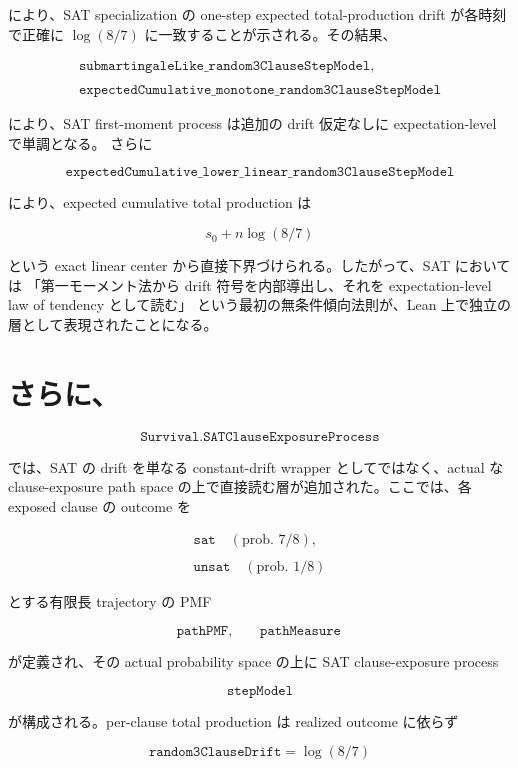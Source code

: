 \documentclass[12pt,a4paper]{article}
\begin{document}
により、SAT specialization の one-step expected total-production drift が各時刻で正確に \(\log(8/7)\) に一致することが示される。その結果、

\[
\begin{aligned}
\texttt{submartingaleLike\_random3ClauseStepModel}, \\
\qquad \\
\texttt{expectedCumulative\_monotone\_random3ClauseStepModel}
\end{aligned}
\]

により、SAT first-moment process は追加の drift 仮定なしに expectation-level で単調となる。 さらに

\[
\texttt{expectedCumulative\_lower\_linear\_random3ClauseStepModel}
\]

により、expected cumulative total production は

\[
s_0 + n\log(8/7)
\]

という exact linear center から直接下界づけられる。したがって、SAT においては 「第一モーメント法から drift 符号を内部導出し、それを expectation-level law of tendency として読む」 という最初の無条件傾向法則が、Lean 上で独立の層として表現されたことになる。

\section{さらに、}\label{ux3055ux3089ux306b-15}

\[
\texttt{Survival.SATClauseExposureProcess}
\]

では、SAT の drift を単なる constant-drift wrapper としてではなく、actual な clause-exposure path space の上で直接読む層が追加された。ここでは、各 exposed clause の outcome を

\[
\begin{aligned}
\texttt{sat} \quad (\text{prob. } 7/8), \\
\qquad \\
\texttt{unsat} \quad (\text{prob. } 1/8)
\end{aligned}
\]

とする有限長 trajectory の PMF

\[
\texttt{pathPMF},\qquad \texttt{pathMeasure}
\]

が定義され、その actual probability space の上に SAT clause-exposure process

\[
\texttt{stepModel}
\]

が構成される。per-clause total production は realized outcome に依らず

\[
\texttt{random3ClauseDrift}=\log(8/7)
\]
\end{document}
